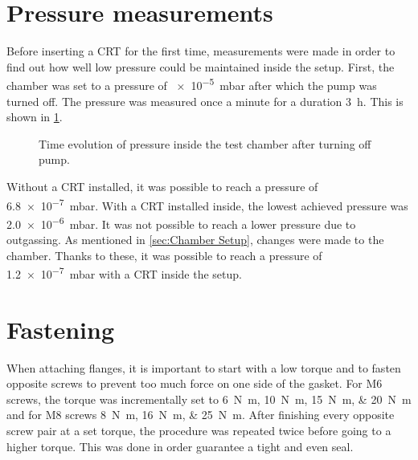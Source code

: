 \section{Pressure measurements}
\label{sec:Pressure measurements}

Before inserting a CRT for the first time, measurements were made in order to find out how well low pressure could be maintained inside the setup. First, the chamber was set to a pressure of \SI{e-5}{\milli\bar} after which the pump was turned off. The pressure was measured once a minute for a duration \SI{3}{\hour}. This is shown in \cref{fig:Time evolution of pressure inside the test chamber after turning off pump}.

\begin{figure}[ht]
	\centering
		
	\begin{tikzpicture}
		
	\end{tikzpicture}
	
	\caption{Time evolution of pressure inside the test chamber after turning off pump.}
	\label{fig:Time evolution of pressure inside the test chamber after turning off pump}
\end{figure}

Without a CRT installed, it was possible to reach a pressure of \SI{6.8e-7}{\milli\bar}. With a CRT installed inside, the lowest achieved pressure was \SI{2.0e-6}{\milli\bar}. It was not possible to reach a lower pressure due to outgassing. As mentioned in \cref{sec:Chamber Setup}, changes were made to the chamber. Thanks to these, it was possible to reach a pressure of \SI{1.2e-7}{\milli\bar} with a CRT inside the setup.

\section{Fastening}
\label{sec:Fastening}

When attaching flanges, it is important to start with a low torque and to fasten opposite screws to prevent too much force on one side of the gasket. For M6 screws, the torque was incrementally set to \SIlist{6;10;15;20}{\newton\meter} and for M8 screws \SIlist{8;16;25}{\newton\meter}. After finishing every opposite screw pair at a set torque, the procedure was repeated twice before going to a higher torque. This was done in order guarantee a tight and even seal.